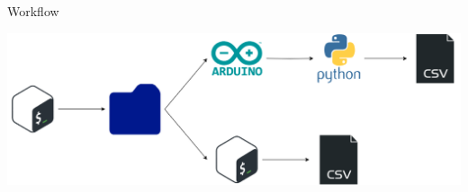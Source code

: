
\begin{frame}{Workflow}

\begin{center}
    \includegraphics[height=0.30\textwidth]{images/introduction/workflow.png}
\end{center}

\end{frame}

